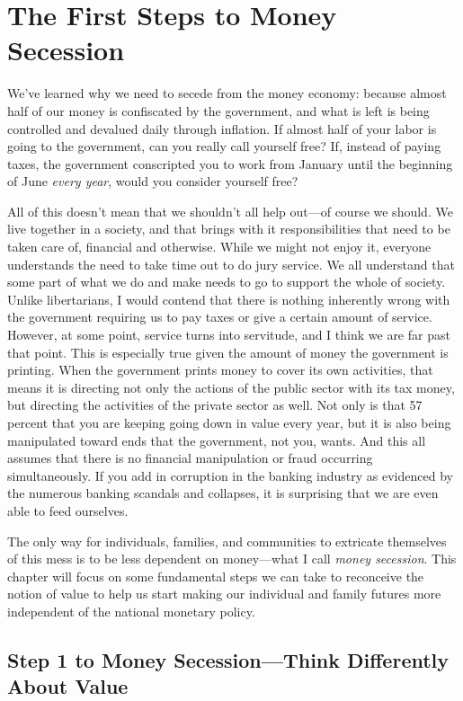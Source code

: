 \chapter{The First Steps to Money Secession}

We’ve learned why we need to secede from the money economy:
because almost half
of our money is confiscated by the government, and what is left is
being controlled and devalued daily through inflation. If almost half of your labor is
going to the government, can you really call yourself free?  If,
instead of paying taxes, the government conscripted you to work from
January until the beginning of June \textit{every year}, would you
consider yourself free?

All of this doesn’t
mean that we shouldn’t all help out---of course we should. We live together
in a society, and that brings with it responsibilities that need to be
taken care of, financial and otherwise.  While we might
not enjoy it, everyone understands the need to take time out to do jury
service. We all understand that some part of what we do and make needs to go to
support the whole of society. Unlike libertarians, I would contend that
there is nothing inherently wrong with the government requiring us to
pay taxes or give a certain amount of service. However, at some point,
service turns into servitude, and I think we are far past that point.
This is especially true given the amount of money the government is
printing. When the government prints money to cover its own activities,
that means it is directing not only the actions of the public sector
with its tax money, but directing the activities of the private sector
as well. Not only is that 57 percent that you are keeping going down in
value every year, but it is also being manipulated toward ends that the
government, not you, wants.  And this all assumes that there is no
financial manipulation or fraud occurring simultaneously.  If you add
in corruption in the banking industry as evidenced by the numerous
banking scandals and collapses, it is surprising that we are
even able to feed ourselves.

The only way for individuals, families, and communities to extricate
themselves of this mess is to be less dependent on money---what I call
\textit{money secession}. This chapter
will focus on some fundamental steps we can take to reconceive the
notion of value to help us start making our individual and family futures more independent of
the national monetary policy.

\section{Step 1 to Money Secession---Think Differently About Value}

